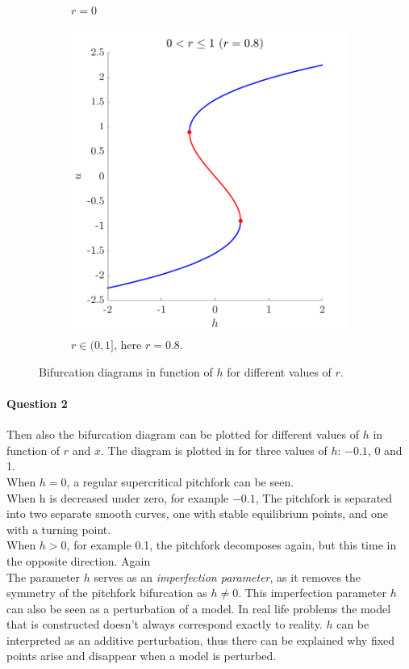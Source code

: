 \documentclass[a4paper,11pt]{article}
\begin{document}
\begin{figure}[H]
{\begin{subfigure}{0.43\linewidth}
		\caption{$r=0$}
		\label{fig:bifhxr0}
	\end{subfigure}
	\begin{subfigure}{0.43\linewidth}
		\centering
		\includegraphics[width=\textwidth]{bifhxr1.png}
		\caption{$r\in(0,1]$, here $r=0.8$.}
	\end{subfigure}
	}
	\caption{Bifurcation diagrams in function of $h$ for different values of $r$.}
	\label{fig:bifhx}
	\vspace{-4mm}
\end{figure}

\paragraph{Question 2}\: Then also the bifurcation diagram can be plotted for different values of $h$ 
in function of $r$ and $x$. The diagram is plotted in  for three values of $h$: $-0.1$, 0 and 1.\\
When $h=0$, a regular supercritical pitchfork can be seen.\\ When h is decreased under zero, for example $-0.1$, 
The pitchfork is separated into two separate smooth curves, one with stable equilibrium points, and one with
a turning point.\\
When $h>0$, for example 0.1, the pitchfork decomposes again, but this time in the opposite direction.
Again \\
The parameter $h$ serves as an \textit{imperfection parameter}, as it removes the symmetry of the pitchfork bifurcation
as $h\neq0$.
This imperfection parameter $h$ can also be seen as a perturbation of a model. In real life problems 
the model that is constructed doesn't always correspond exactly to reality.
$h$ can be interpreted as an additive perturbation, thus there can be explained why fixed points arise
and disappear when a model is perturbed.
\end{document}
